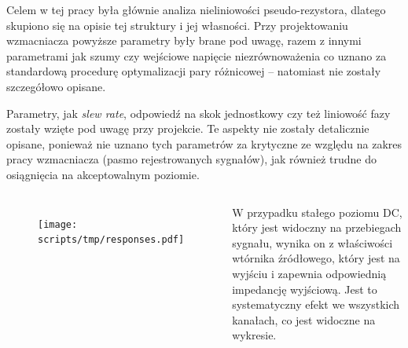 \begin{frame}[t]
    \vspace{-1em}
    \begin{block}{\dk}
        {\renewcommand\normalsize{\small}%
        \normalsize
        }
    \end{block}
    {\renewcommand\normalsize{\small}%
    \normalsize
        Celem w tej pracy była głównie analiza nieliniowości pseudo-rezystora, dlatego skupiono się na opisie tej struktury i jej własności. 
        Przy projektowaniu wzmacniacza powyższe parametry były brane pod uwagę, razem z innymi parametrami jak szumy czy wejściowe napięcie niezrównoważenia co uznano za standardową procedurę optymalizacji pary różnicowej -- natomiast nie zostały szczegółowo opisane.

        Parametry, jak \textit{slew rate}, odpowiedź na skok jednostkowy czy też liniowość fazy zostały wzięte pod uwagę przy projekcie. 
        Te aspekty nie zostały detalicznie opisane, ponieważ nie uznano tych parametrów za krytyczne ze względu na zakres pracy wzmacniacza (pasmo rejestrowanych sygnałów), jak również trudne do osiągnięcia na akceptowalnym poziomie. 
    }
\end{frame}

\begin{frame}[t]
    \begin{columns}

\vspace{-1em}
        \begin{figure}
            \centering
            \texttt{[image: scripts/tmp/responses.pdf]}
        \end{figure}
        W przypadku stałego poziomu DC, który jest widoczny na przebiegach sygnału, wynika on z właściwości wtórnika źródłowego, który jest na wyjściu i zapewnia odpowiednią impedancję wyjściową. 
        Jest to systematyczny efekt we wszystkich kanałach, co jest widoczne na wykresie. 

    \end{columns}


\end{frame}



